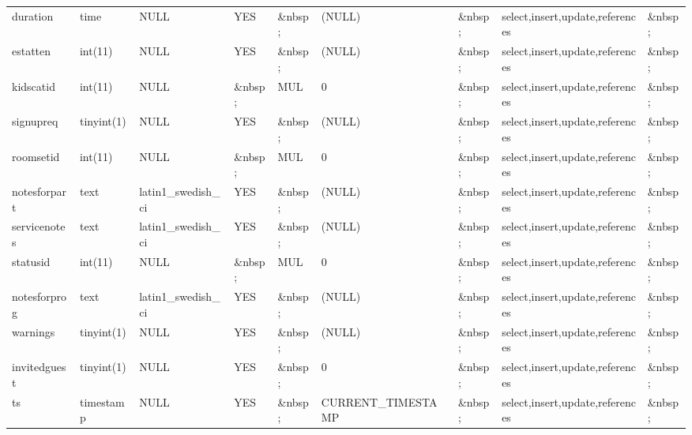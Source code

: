 \documentclass[tablesignature,landscape]{scrartcl}
\begin{document}
\begin{longtable}{|l|l|l|l|l|l|l|l|l|}
 duration        &  time          &  NULL                     &  YES      &  \&nbsp;  &  (NULL)                &  \&nbsp;            &  select,insert,update,references  &  \&nbsp;  \\
 estatten        &  int(11)       &  NULL                     &  YES      &  \&nbsp;  &  (NULL)                &  \&nbsp;            &  select,insert,update,references  &  \&nbsp;  \\
 kidscatid       &  int(11)       &  NULL                     &  \&nbsp;  &  MUL      &  0                     &  \&nbsp;            &  select,insert,update,references  &  \&nbsp;  \\
 signupreq       &  tinyint(1)    &  NULL                     &  YES      &  \&nbsp;  &  (NULL)                &  \&nbsp;            &  select,insert,update,references  &  \&nbsp;  \\
 roomsetid       &  int(11)       &  NULL                     &  \&nbsp;  &  MUL      &  0                     &  \&nbsp;            &  select,insert,update,references  &  \&nbsp;  \\
 notesforpart    &  text          &  latin1\_{}swedish\_{}ci  &  YES      &  \&nbsp;  &  (NULL)                &  \&nbsp;            &  select,insert,update,references  &  \&nbsp;  \\
 servicenotes    &  text          &  latin1\_{}swedish\_{}ci  &  YES      &  \&nbsp;  &  (NULL)                &  \&nbsp;            &  select,insert,update,references  &  \&nbsp;  \\
 statusid        &  int(11)       &  NULL                     &  \&nbsp;  &  MUL      &  0                     &  \&nbsp;            &  select,insert,update,references  &  \&nbsp;  \\
 notesforprog    &  text          &  latin1\_{}swedish\_{}ci  &  YES      &  \&nbsp;  &  (NULL)                &  \&nbsp;            &  select,insert,update,references  &  \&nbsp;  \\
 warnings        &  tinyint(1)    &  NULL                     &  YES      &  \&nbsp;  &  (NULL)                &  \&nbsp;            &  select,insert,update,references  &  \&nbsp;  \\
 invitedguest    &  tinyint(1)    &  NULL                     &  YES      &  \&nbsp;  &  0                     &  \&nbsp;            &  select,insert,update,references  &  \&nbsp;  \\
 ts              &  timestamp     &  NULL                     &  YES      &  \&nbsp;  &  CURRENT\_{}TIMESTAMP  &  \&nbsp;            &  select,insert,update,references  &  \&nbsp;  \\
\hline
\end{longtable}
\end{document}
